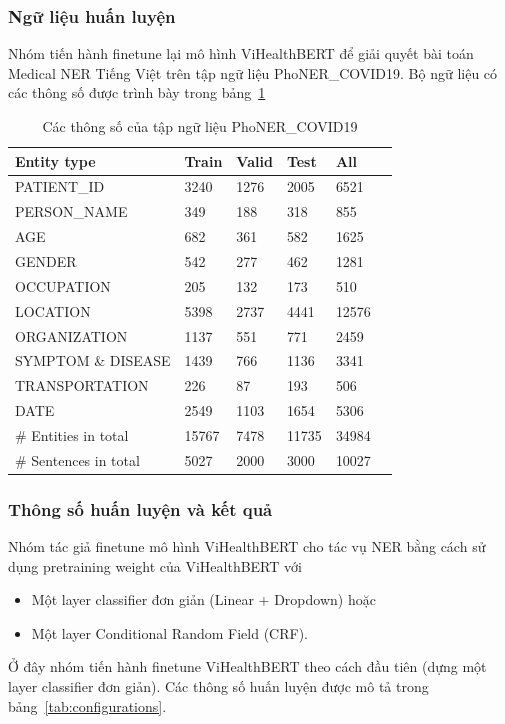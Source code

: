 \subsubsection{Ngữ liệu huấn luyện}
Nhóm tiến hành finetune lại mô hình ViHealthBERT để giải quyết bài toán Medical NER Tiếng Việt trên tập ngữ liệu PhoNER\_COVID19\cite{truong-etal-2021-covid}. Bộ ngữ liệu có các thông số được trình bày trong bảng~\ref{tab:covid-ner-vietnamese-stats}
\begin{table}
\centering
\begin{tabular}{|l|l|l|l|l|l|}
\hline
\textbf{Entity type} & \textbf{Train} & \textbf{Valid} & \textbf{Test} & \textbf{All} \\
\hline
PATIENT\_ID & 3240 & 1276 & 2005 & 6521 \\
\hdashline
PERSON\_NAME & 349 & 188 & 318 & 855 \\
\hdashline
AGE & 682 & 361 & 582 & 1625 \\
\hdashline
GENDER & 542 & 277 & 462 & 1281 \\
\hdashline
OCCUPATION & 205 & 132 & 173 & 510 \\
\hdashline
LOCATION & 5398 & 2737 & 4441 & 12576 \\
\hdashline
ORGANIZATION & 1137 & 551 & 771 & 2459 \\
\hdashline
SYMPTOM \& DISEASE & 1439 & 766 & 1136 & 3341 \\
\hdashline
TRANSPORTATION & 226 & 87 & 193 & 506 \\
\hdashline
DATE & 2549 & 1103 & 1654 & 5306 \\
\hline
\# Entities in total & 15767 & 7478 & 11735 & 34984 \\
\hline
\# Sentences in total & 5027 & 2000 & 3000 & 10027 \\
\hline
\end{tabular}
\caption{Các thông số của tập ngữ liệu PhoNER\_COVID19\cite{truong-etal-2021-covid}}
\label{tab:covid-ner-vietnamese-stats}
\end{table}

\subsubsection{Thông số huấn luyện và kết quả}
Nhóm tác giả finetune mô hình ViHealthBERT cho tác vụ NER bằng cách sử dụng pretraining weight của ViHealthBERT với
\begin{itemize}
\item Một layer classifier đơn giản (Linear + Dropdown) hoặc
\item Một layer Conditional Random Field (CRF).
\end{itemize}
Ở đây nhóm tiến hành finetune ViHealthBERT theo cách đầu tiên (dựng một layer classifier đơn giản). Các thông số huấn luyện được mô tả trong bảng~\ref{tab:configurations}. 

